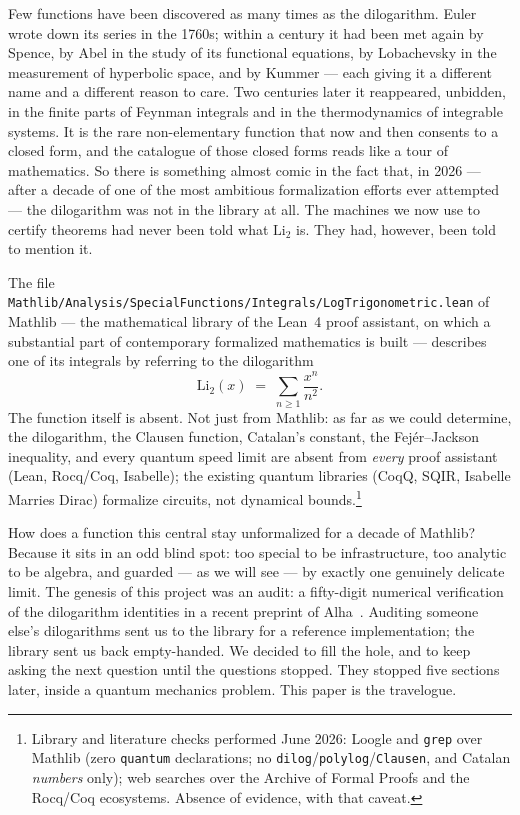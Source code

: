 \documentclass[11pt]{article}
\newcommand{\lean}[1]{\texttt{#1}}
\newcommand{\Li}{\mathrm{Li}_2}
\begin{document}
Few functions have been discovered as many times as the dilogarithm. Euler wrote down
its series in the 1760s; within a century it had been met again by Spence, by Abel in
the study of its functional equations, by Lobachevsky in the measurement of hyperbolic
space, and by Kummer --- each giving it a different name and a different reason to care.
Two centuries later it reappeared, unbidden, in the finite parts of Feynman integrals
and in the thermodynamics of integrable systems. It is the rare non-elementary function
that now and then consents to a closed form, and the catalogue of those closed forms
reads like a tour of mathematics. So there is something almost comic in the fact that,
in 2026 --- after a decade of one of the most ambitious formalization efforts ever
attempted --- the dilogarithm was not in the library at all. The machines we now use to
certify theorems had never been told what $\Li$ is. They had, however, been told to
mention it.

The file \lean{Mathlib/Analysis/SpecialFunctions/Integrals/LogTrigonometric.lean} of
Mathlib --- the mathematical library of the Lean~4 proof assistant, on which a
substantial part of contemporary formalized mathematics is built --- describes one of
its integrals by referring to the dilogarithm
\[
\Li(x) \;=\; \sum_{n\ge 1}\frac{x^n}{n^2}.
\]
The function itself is absent. Not just from Mathlib: as far as we could determine,
the dilogarithm, the Clausen function, Catalan's constant, the Fej\'er--Jackson
inequality, and every quantum speed limit are absent from \emph{every} proof assistant
(Lean, Rocq/Coq, Isabelle); the existing quantum libraries (CoqQ, SQIR, Isabelle Marries
Dirac) formalize circuits, not dynamical bounds.\footnote{Library and literature checks
performed June 2026: Loogle and \lean{grep} over Mathlib (zero \lean{quantum}
declarations; no \lean{dilog}/\lean{polylog}/\lean{Clausen}, and Catalan
\emph{numbers} only); web searches over the Archive of Formal Proofs and the Rocq/Coq
ecosystems. Absence of evidence, with that caveat.}

How does a function this central stay unformalized for a decade of Mathlib? Because it
sits in an odd blind spot: too special to be infrastructure, too analytic to be
algebra, and guarded --- as we will see --- by exactly one genuinely delicate limit. The
genesis of this project was an audit: a fifty-digit numerical verification of the
dilogarithm identities in a recent preprint of Alha~\cite{alha}. Auditing someone
else's dilogarithms sent us to the library for a reference implementation; the library
sent us back empty-handed. We decided to fill the hole, and to keep asking the next
question until the questions stopped. They stopped five sections later, inside a
quantum mechanics problem. This paper is the travelogue.
\end{document}
